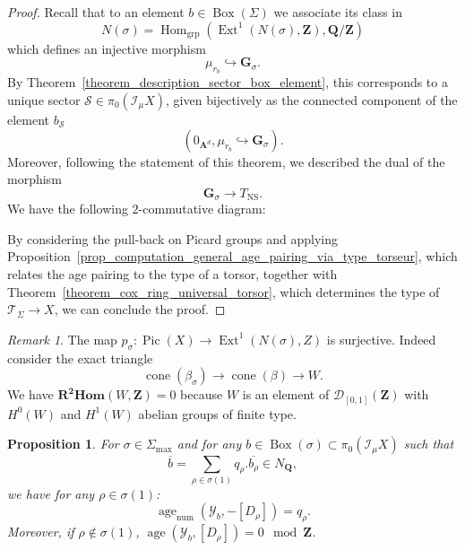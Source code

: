 \documentclass{proc-l}
\newcommand{\Z}{\mathbf{Z}}
\newcommand{\Q}{\mathbf{Q}}
\newcommand{\G}{\mathbf{G}}
\DeclareMathOperator{\Pic}{Pic}
\DeclareMathOperator{\grp}{grp}
\DeclareMathOperator{\Hom}{Hom}
\DeclareMathOperator{\Ext}{Ext}
\DeclareMathOperator{\coneform}{cone}
\DeclareMathOperator{\num}{num}
\DeclareMathOperator{\age}{age}
\DeclareMathOperator{\NS}{NS}
\DeclareMathOperator{\Boxe}{Box}
\newcommand{\stackY}{\mathcal{Y}}
\newcommand{\stackS}{\mathcal{S}}
\newcommand{\stackT}{\mathcal{T}}
\newcommand{\affine}{\mathbf{A}}
\newcommand{\sheafI}{\mathcal{I}}
\newcommand{\sector}{\pi_0(\sheafI_{\mu} X)}
\newtheorem{prop}[theorem]{Proposition}
\theoremstyle{definition}
\theoremstyle{remark}
\newtheorem{remark}[theorem]{Remark}
\numberwithin{equation}{section}
\begin{document}
\begin{proof}
Recall that to an element $b \in \Boxe(\Sigma)$ we associate its class in
$$
N(\sigma) = \Hom_{\grp}(\Ext^1(N(\sigma),\Z),\Q/\Z)
$$
which defines an injective morphism
$$
\mu_{r_b} \hookrightarrow \G_{\sigma}.
$$
By Theorem~\ref{theorem_description_sector_box_element}, this corresponds to a unique sector $\stackS \in \sector$, given bijectively as the connected component of the element $b_{\stackS}$
$$
(0_{\affine^d},\mu_{r_b} \hookrightarrow \G_{\sigma}).
$$Moreover, following the statement of this theorem, we described the dual of the morphism
$$ \G_{\sigma} \rightarrow T_{\NS}. $$We have the following $2$-commutative diagram:
\begin{center}
\end{center}
By considering the pull-back on Picard groups and applying Proposition~\ref{prop_computation_general_age_pairing_via_type_torseur},
which relates the age pairing to the type of a torsor, together with
Theorem~\ref{theorem_cox_ring_universal_torsor}, which determines the type of
$\stackT_{\Sigma} \rightarrow X$, we can conclude the proof.
\end{proof}


\begin{remark}
    The map $p_{\sigma} : \Pic(X) \rightarrow \Ext^1(N(\sigma),Z)$ is surjective. Indeed consider the exact triangle $$\coneform(\beta_{\sigma}) \rightarrow \coneform(\beta) \rightarrow W .$$ We have $\mathbf{R^2 Hom}(W,\Z) = 0$ because $W$ is an element of $\mathcal{D}_{[0,1]}(\Z)$ with $H^0(W)$ and $H^1(W)$ abelian groups of finite type.
\end{remark}


\begin{prop}\label{prop_age_divisor_associated_to_an_edge}
For $\sigma \in \Sigma_{\max}$ and for any $b \in \Boxe(\sigma) \subset \sector$ such that $$\overline{b} = \sum\limits_{\rho \in \sigma(1)} q_{\rho} . \overline{b_{\rho}} \in N_{\Q},$$ we have for any $\rho \in \sigma(1)$:
$$\age_{\num}(\stackY_b,-[D_{\rho}]) = q_{\rho} .$$Moreover, if $\rho \not\in \sigma(1)$, $\age(\stackY_b,[D_{\rho}]) = 0 \mod \Z$.
\end{prop}
\end{document}
